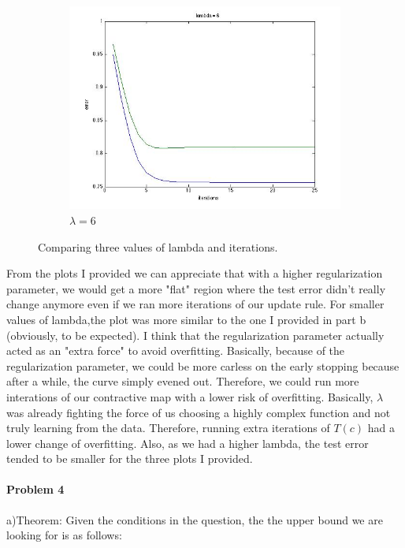 \documentclass[12pt]{report}
\begin{document}
\begin{figure}
\begin{subfigure}[b]{0.3\textwidth}
        \centering
        \includegraphics[width=\textwidth]{l6.jpg}
        \caption{$\lambda = 6$}
        \label{fig:five over x}
    \end{subfigure}
    \caption{Comparing three values of lambda and iterations.}
    \label{fig:3d}
\end{figure}

From the plots I provided we can appreciate that with a higher regularization parameter, we would get a more "flat" region where the test error didn't really change anymore even if we ran more iterations of our update rule. For smaller values of lambda,the plot was more similar to the one I provided in part b (obviously, to be expected). I think that the regularization parameter actually acted as an "extra force" to avoid overfitting. Basically, because of the regularization parameter, we could be more carless on the early stopping because after a while, the curve simply evened out. Therefore, we could run more interations of our contractive map with a lower risk of overfitting. Basically, $\lambda$ was already fighting the force of us choosing a highly complex function and not truly learning from the data. Therefore, running extra iterations of $T(c)$ had a lower change of overfitting. Also, as we had a higher lambda, the test error tended to be smaller for the three plots I provided. 

\paragraph{Problem 4}
a)Theorem: Given the conditions in the question, the the upper bound we are looking for is as follows:
\end{document}
